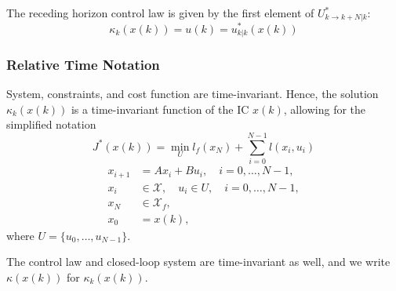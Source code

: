 \newpar{}

The receding horizon control law is given by the first element of $U^*_{k \to k+N | k}$:
\begin{equation*}
    \kappa_k(x(k)) = u(k) = u^*_{k | k}(x(k))
\end{equation*}

\subsubsection{Relative Time Notation}

System, constraints, and cost function are time-invariant. Hence, the solution $\kappa_k(x(k))$ is a time-invariant function of the IC $x(k)$, allowing for the simplified notation
\begin{equation*}
    J^*(x(k)) = \min_U l_f(x_N) + \sum_{i=0}^{N-1} l(x_i, u_i)
\end{equation*}
\begin{align*}
    x_{i+1} & = A x_i + B u_i, \quad i = 0, \dots, N - 1,                  \\
    x_i     & \in \mathcal{X}, \quad u_i \in U, \quad i = 0, \dots, N - 1, \\
    x_N     & \in \mathcal{X}_f,                                           \\
    x_0     & = x(k),
\end{align*}
where $U = \{u_0, \dots, u_{N-1}\}$.

\newpar{}

The control law and closed-loop system are time-invariant as well, and we write $\kappa(x(k))$ for $\kappa_k(x(k))$.

